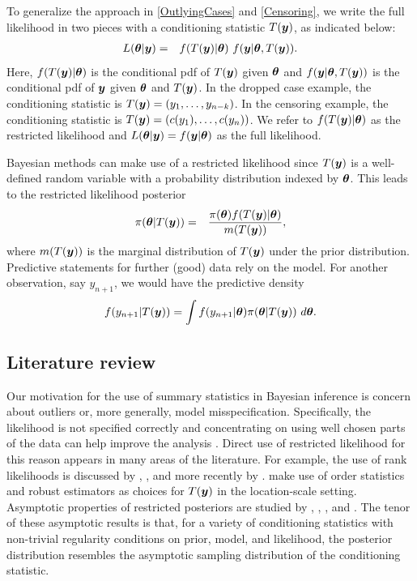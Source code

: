 \documentclass[ba]{imsart}
\def\bth{\mbox{\boldmath $\theta$}}
\newcommand{\by}{\mbox{\boldmath $y$}}
\begin{document}
To generalize the approach in \eqref{OutlyingCases} and
\eqref{Censoring}, %
we write the full likelihood in two pieces with a conditioning statistic $T(\by)$, as indicated below:
\begin{eqnarray}
\label{FullLikelihood}
L(\bth | \by)  
& = & f(T(\by) | \bth) \,\, f(\by |\bth, T(\by)) .  
\end{eqnarray}
Here,  $f(T(\by) | \bth)$ is the conditional pdf of $T(\by)$ given $\bth$ and $f(\by |\bth, T(\by))$ is the conditional pdf of $\by$ given $\bth$ and $T(\by)$.  In the dropped case example, the conditioning statistic is $T(\by) = (y_1, \ldots, y_{n-k})$.  In 
the censoring example, the conditioning statistic is $T(\by) = (c(y_1),\ldots,c(y_n))$.  We refer to 
$f(T(\by) | \bth)$ as the restricted likelihood and $L(\bth | \by)=f(\by|\bth)$ as the full likelihood.  

Bayesian methods can make use of a restricted likelihood %
since $T(\by)$ is a well-defined random variable with a probability distribution indexed by $\bth$.  
This leads to the restricted likelihood posterior 
\begin{eqnarray}
\label{RestrictedPosterior}
\pi(\bth | T(\by)) & = & \frac{\pi(\bth) f(T(\by) | \bth)}{m(T(\by))} ,
\end{eqnarray}
where $m(T(\by))$ is the marginal distribution of $T(\by)$ under the prior distribution.  
Predictive statements for further (good) data rely on the model.  For another observation,
say $y_{n+1}$, we would have the predictive density 
\begin{eqnarray}
\label{RestrictedpredDist}
f(y_{n+1} | T(\by)) = \int f(y_{n+1} | \bth) \pi(\bth | T(\by))\ d\bth .  
\end{eqnarray}

\subsection{Literature review}

Our motivation for the use of summary statistics in Bayesian inference is concern about outliers or, more generally, model misspecification. Specifically, the likelihood is not specified correctly and concentrating on using well chosen parts of the data can help improve the analysis \citep[e.g.,][]{wong2004}. Direct use of restricted likelihood for this reason appears in many areas of the literature.  For example, the use of rank likelihoods is discussed by \cite{savage1969}, \cite{pettitt1983, pettitt1982}, and more recently by \cite{hoff2013}.  
\cite{lewis2012} make use of order statistics and robust estimators as choices for $T(\by)$ in the location-scale setting. 
Asymptotic properties of restricted posteriors are studied by \cite{doksum1990}, \cite{clarke1995}, \cite{yuan2004},  and \cite{hwang2005}. The tenor of these asymptotic results is that, for a variety of conditioning statistics with non-trivial regularity conditions on prior, model, and likelihood, the
posterior distribution resembles the asymptotic sampling distribution of the conditioning statistic.  
\end{document}
